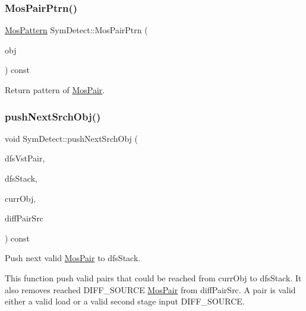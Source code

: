 \subsubsection{\texorpdfstring{Mos\+Pair\+Ptrn()}{MosPairPtrn()}}
{\footnotesize\ttfamily \hyperlink{type_8h_af19eddb079bfea723256710b029c38e8}{Mos\+Pattern} Sym\+Detect\+::\+Mos\+Pair\+Ptrn (\begin{DoxyParamCaption}\item[{\hyperlink{classMosPair}{Mos\+Pair} \&}]{obj }\end{DoxyParamCaption}) const\hspace{0.3cm}{\ttfamily [private]}}



Return pattern of \hyperlink{classMosPair}{Mos\+Pair}. 

\mbox{\label{classSymDetect_a7f4cd1010a21da88d35abb89c6f33f00}} 
\subsubsection{\texorpdfstring{push\+Next\+Srch\+Obj()}{pushNextSrchObj()}}
{\footnotesize\ttfamily void Sym\+Detect\+::push\+Next\+Srch\+Obj (\begin{DoxyParamCaption}\item[{std\+::vector$<$ \hyperlink{classMosPair}{Mos\+Pair} $>$ \&}]{dfs\+Vst\+Pair,  }\item[{std\+::vector$<$ \hyperlink{classMosPair}{Mos\+Pair} $>$ \&}]{dfs\+Stack,  }\item[{\hyperlink{classMosPair}{Mos\+Pair} \&}]{curr\+Obj,  }\item[{std\+::vector$<$ \hyperlink{classMosPair}{Mos\+Pair} $>$ \&}]{diff\+Pair\+Src }\end{DoxyParamCaption}) const\hspace{0.3cm}{\ttfamily [private]}}



Push next valid \hyperlink{classMosPair}{Mos\+Pair} to dfs\+Stack. 

This function push valid pairs that could be reached from curr\+Obj to dfs\+Stack. It also removes reached D\+I\+F\+F\+\_\+\+S\+O\+U\+R\+CE \hyperlink{classMosPair}{Mos\+Pair} from diff\+Pair\+Src. A pair is valid either a valid load or a valid second stage input D\+I\+F\+F\+\_\+\+S\+O\+U\+R\+CE.

